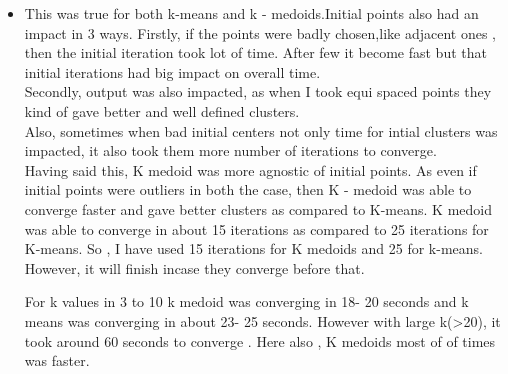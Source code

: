 \documentclass[twoside,10pt]{article}
\begin{document}
\begin{itemize}
\item This was true for both k-means and k - medoids.Initial points also had an impact in 3 ways. Firstly, if the points were badly chosen,like adjacent ones , then the initial iteration took lot of time. After few it become fast but that initial iterations had big impact on overall time. \\
Secondly, output was also impacted, as when I took equi spaced points they kind of gave better and well defined clusters.\\
Also, sometimes when bad initial centers not only time for intial clusters was impacted, it also took them more number of iterations to converge.\\

Having said this, K medoid was more agnostic of initial points. As even if initial points were outliers in both the case, then K - medoid was able to converge faster and gave better clusters as compared to K-means. K medoid was able to converge in about 15 iterations as compared to 25 iterations for K-means.
So , I have used 15 iterations for K medoids and 25 for k-means. However, it will finish incase they converge before that.

For k values in 3 to 10 k medoid was converging in 18- 20 seconds and k means was converging in about 23- 25 seconds. However with large k(>20), it took around 60 seconds to converge . Here also , K medoids most of of times was faster.
\end{itemize}
%
%
\end{document}
